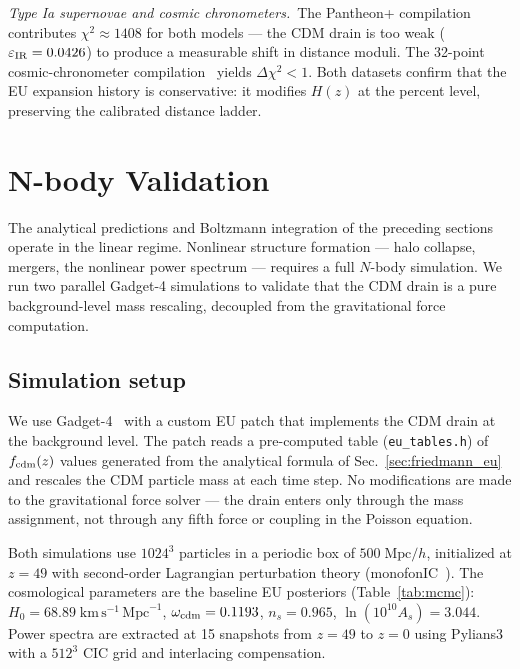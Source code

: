 \documentclass[a4paper,fleqn]{cas-dc}
\begin{document}
\textit{Type Ia supernovae and cosmic chronometers.}~The
Pantheon+ compilation~\cite{brout2022} contributes
$\chi^2 \approx 1408$ for both models --- the CDM drain
is too weak ($\varepsilon_{\rm IR} = 0.0426$) to produce
a measurable shift in distance moduli. The 32-point
cosmic-chronometer compilation~\cite{moresco2022}
yields $\Delta\chi^2 < 1$. Both datasets confirm that
the EU expansion history is conservative: it modifies
$H(z)$ at the percent level, preserving the
calibrated distance ladder.

\section{N-body Validation}
\label{sec:nbody}

The analytical predictions and Boltzmann integration of the
preceding sections operate in the linear regime. Nonlinear
structure formation --- halo collapse, mergers, the nonlinear
power spectrum --- requires a full $N$-body simulation. We run
two parallel Gadget-4 simulations to validate that the CDM
drain is a pure background-level mass rescaling, decoupled
from the gravitational force computation.

\subsection{Simulation setup}
\label{sec:nbody_setup}

We use Gadget-4~\cite{gadget4} with a custom EU patch that
implements the CDM drain at the background level. The patch
reads a pre-computed table (\texttt{eu\_tables.h}) of
$f_{\rm cdm}(z)$ values generated from the analytical
formula of Sec.~\ref{sec:friedmann_eu} and rescales the CDM
particle mass at each time step. No modifications are
made to the gravitational force solver --- the
drain enters only through the mass assignment, not
through any fifth force or coupling in the Poisson equation.

Both simulations use $1024^3$ particles in a periodic box
of $500\;\text{Mpc}/h$, initialized at $z = 49$ with
second-order Lagrangian perturbation theory
(monofonIC~\cite{monofonic}). The cosmological parameters
are the baseline EU posteriors
(Table~\ref{tab:mcmc}):
$H_0 = 68.89\;\text{km}\,\text{s}^{-1}\,\text{Mpc}^{-1}$,
$\omega_{\rm cdm} = 0.1193$, $n_s = 0.965$,
$\ln(10^{10}A_s) = 3.044$. Power spectra are extracted at
15 snapshots from $z = 49$ to $z = 0$ using
Pylians3~\cite{pylians} with a $512^3$ CIC grid and
interlacing compensation.
\end{document}
